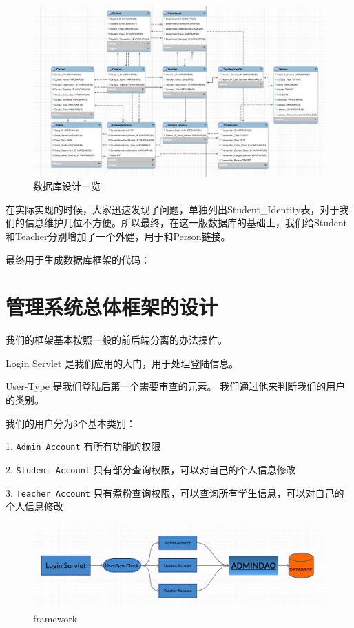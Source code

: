 \documentclass[../report.tex]{subfiles}
\begin{document}
\begin{figure}[H]
\centering
\includegraphics[width=1\linewidth]{../figure/database-design.png}
\caption{数据库设计一览}
\label{fig:database-design}
\end{figure}

在实际实现的时候，大家迅速发现了问题，单独列出Student\_Identity表，对于我们的信息维护几位不方便。所以最终，在这一版数据库的基础上，我们给Student和Teacher分别增加了一个外健，用于和Person链接。

最终用于生成数据库框架的代码：

\section{管理系统总体框架的设计}

我们的框架基本按照一般的前后端分离的办法操作。

Login Servlet 是我们应用的大门，用于处理登陆信息。

User-Type 是我们登陆后第一个需要审查的元素。 我们通过他来判断我们的用户的类别。

我们的用户分为3个基本类别：

1. \texttt{Admin Account} 有所有功能的权限

2. \texttt{Student Account} 只有部分查询权限，可以对自己的个人信息修改

3. \texttt{Teacher Account} 只有煮粉查询权限，可以查询所有学生信息，可以对自己的个人信息修改

\begin{figure}[H]
\centering
\includegraphics[width=1.1\linewidth]{figure/framework}
\caption{framework}
\label{fig:untitledpage}
\end{figure}
\end{document}
